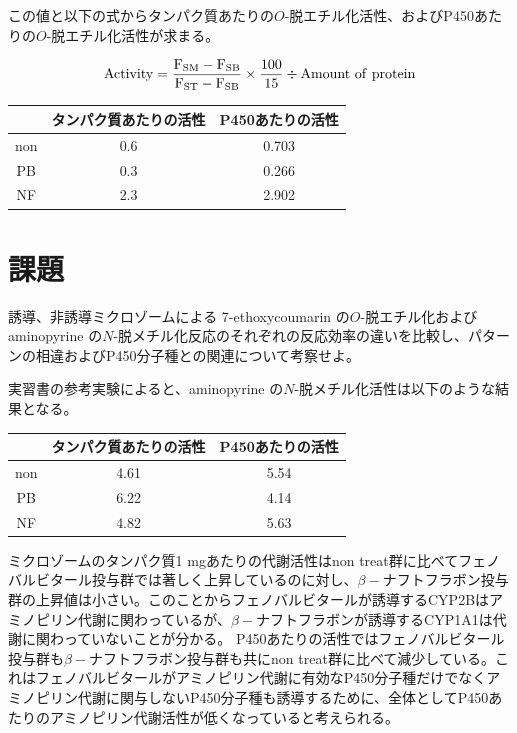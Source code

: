 \documentclass[a4paper,papersize,dvipdfmx]{jsarticle}
\begin{document}
この値と以下の式からタンパク質あたりの$O$-脱エチル化活性、およびP450あたりの$O$-脱エチル化活性が求まる。

\[\rm{Activity} = \frac{F_{SM}-F_{SB}}{F_{ST}-F_{SB}} \times \frac{100}{15} \div \rm{Amount \ of \ protein}\]

\begin{table}[H]
\begin{center}
\begin{tabular}{|c|c|c|}
\hline
& タンパク質あたりの活性 & P450あたりの活性     \\ \hline
non       & 0.6        & 0.703 \\ \hline
PB        & 0.3        & 0.266  \\ \hline
NF        & 2.3        & 2.902   \\ \hline
\end{tabular}
\end{center}
\end{table}

\section*{課題}
\begin{tcolorbox}[colback=white,colbacktitle=black!10!white,coltitle=black,title={(1)}]
誘導、非誘導ミクロゾームによる 7-ethoxycoumarin の$O$-脱エチル化および aminopyrine の$N$-脱メチル化反応のそれぞれの反応効率の違いを比較し、パターンの相違およびP450分子種との関連について考察せよ。
\end{tcolorbox}

実習書の参考実験によると、aminopyrine の$N$-脱メチル化活性は以下のような結果となる。

\begin{table}[H]
\begin{center}
\begin{tabular}{|c|c|c|}
\hline
& タンパク質あたりの活性  & P450あたりの活性    \\ \hline
non & 4.61       & 5.54 \\ \hline
PB  & 6.22       & 4.14 \\ \hline
NF  & 4.82       & 5.63 \\ \hline
\end{tabular}
\end{center}
\end{table}


ミクロゾームのタンパク質1 mgあたりの代謝活性はnon treat群に比べてフェノバルビタール投与群では著しく上昇しているのに対し、$\beta -$ナフトフラボン投与群の上昇値は小さい。このことからフェノバルビタールが誘導するCYP2Bはアミノピリン代謝に関わっているが、$\beta -$ナフトフラボンが誘導するCYP1A1は代謝に関わっていないことが分かる。
P450あたりの活性ではフェノバルビタール投与群も$\beta -$ナフトフラボン投与群も共にnon treat群に比べて減少している。これはフェノバルビタールがアミノピリン代謝に有効なP450分子種だけでなくアミノピリン代謝に関与しないP450分子種も誘導するために、全体としてP450あたりのアミノピリン代謝活性が低くなっていると考えられる。
\end{document}
